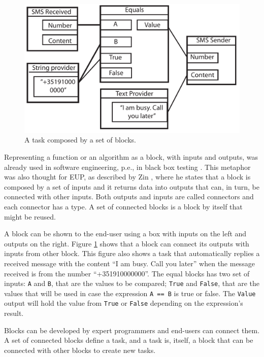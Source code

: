 \documentclass[9pt,a4paper]{extarticle}
\begin{document}
\begin{multicols}{2}

\begin{figure}[H]
\centerline{\includegraphics[scale=.43]{block_example.pdf}}
\caption{A task composed by a set of blocks.} 
\label{fig:block}
\end{figure}

Representing a function or an algorithm as a block, with inputs and outputs, was already used in software engineering, p.e., in black box testing \cite{BlackBoxTesting}. This metaphor was also thought for EUP, as described by Zin \cite{Zin2011}, where he states that a block is composed by a set of inputs and it returns data into outputs that can, in turn, be connected with other inputs.
Both outputs and inputs are called connectors and each connector has a type. A set of connected blocks is a block by itself that might be reused. 

A block can be shown to the end-user using a box with inputs on the left and outputs on the right.
Figure \ref{fig:block} shows that a block can connect its outputs with inputs from other block. This figure also shows a task that automatically replies a received message with the content ``I am busy. Call you later'' when the message received is from the number ``+351910000000''. The equal blocks has two set of inputs: \texttt{A} and  \texttt{B}, that are the values to be compared; \texttt{True} and \texttt{False}, that are the values that will be used in case the expression \texttt{A == B} is true or false. The \texttt{Value} output will hold the value from \texttt{True} or \texttt{False} depending on the expression's result. 

Blocks can be developed by expert programmers and end-users can connect them. A set of connected blocks define a task, and a task is, itself, a block that can be connected with other blocks to create new tasks.


\end{multicols}
\end{document}

